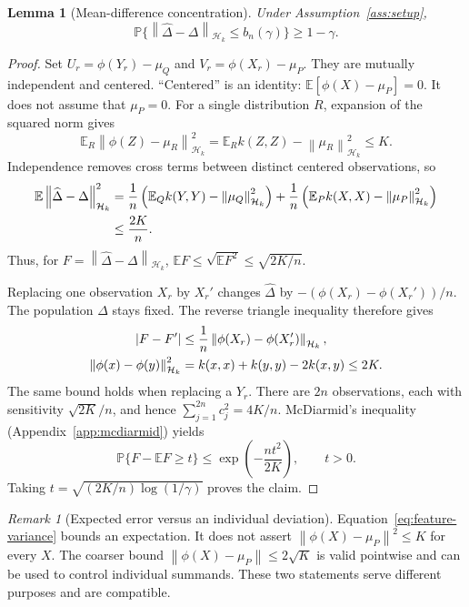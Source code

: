 \documentclass[11pt,a4paper]{article}
\newtheorem{lemma}[theorem]{Lemma}
\theoremstyle{definition}
\theoremstyle{remark}
\newtheorem{remark}[theorem]{Remark}
\newcommand{\HH}{\mathcal H_k}
\newcommand{\E}{\mathbb E}
\newcommand{\Prob}{\mathbb P}
\newcommand{\norm}[1]{\left\lVert#1\right\rVert}
\begin{document}
\begin{lemma}[Mean-difference concentration]\label{lem:mean}
Under Assumption~\ref{ass:setup},
\begin{equation}\label{eq:mean-event}
 \Prob\{\norm{\widehat\Delta-\Delta}_{\HH}
             \le b_n(\gamma)\}\ge1-\gamma.
\end{equation}
\end{lemma}
\begin{proof}
Set $U_r=\phi(Y_r)-\mu_Q$ and $V_r=\phi(X_r)-\mu_P$.
They are mutually independent and centered. ``Centered'' is an identity:
$\E[\phi(X)-\mu_P]=0$. It does not assume that $\mu_P=0$.
For a single distribution $R$, expansion of the squared norm gives
\begin{equation}\label{eq:feature-variance}
 \E_R\norm{\phi(Z)-\mu_R}_{\HH}^2
 =\E_R k(Z,Z)-\norm{\mu_R}_{\HH}^2\le K.
\end{equation}
Independence removes cross terms between distinct centered observations,
so
\begin{align}
 \E\norm{\widehat\Delta-\Delta}_{\HH}^2
 &=\frac1n\left(\E_Q k(Y,Y)-\norm{\mu_Q}_{\HH}^2\right)
  +\frac1n\left(\E_P k(X,X)-\norm{\mu_P}_{\HH}^2\right)\notag\\
 &\le\frac{2K}{n}.\label{eq:delta-second-moment}
\end{align}
Thus, for $F=\norm{\widehat\Delta-\Delta}_{\HH}$,
$\E F\le\sqrt{\E F^2}\le\sqrt{2K/n}$.

Replacing one observation $X_r$ by $X_r'$ changes $\widehat\Delta$ by
$-(\phi(X_r)-\phi(X_r'))/n$. The population $\Delta$ stays fixed.
The reverse triangle inequality therefore gives
\begin{align}
 |F-F'|&\le\frac1n\norm{\phi(X_r)-\phi(X_r')}_{\HH},\notag\\
 \norm{\phi(x)-\phi(y)}_{\HH}^2
 &=k(x,x)+k(y,y)-2k(x,y)\le2K.\label{eq:feature-diameter}
\end{align}
The same bound holds when replacing a $Y_r$. There are $2n$ observations,
each with sensitivity $\sqrt{2K}/n$, and hence
$\sum_{j=1}^{2n}c_j^2=4K/n$.
McDiarmid's inequality (Appendix~\ref{app:mcdiarmid}) yields
\begin{equation}\label{eq:mean-tail}
 \Prob\{F-\E F\ge t\}
 \le\exp\left(-\frac{nt^2}{2K}\right),\qquad t>0.
\end{equation}
Taking $t=\sqrt{(2K/n)\log(1/\gamma)}$ proves the claim.
\end{proof}

\begin{remark}[Expected error versus an individual deviation]
Equation~\eqref{eq:feature-variance} bounds an expectation. It does not
assert $\norm{\phi(X)-\mu_P}^2\le K$ for every $X$.
The coarser bound $\norm{\phi(X)-\mu_P}\le2\sqrt K$ is valid pointwise
and can be used to control individual summands. These two statements
serve different purposes and are compatible.
\end{remark}
\end{document}
